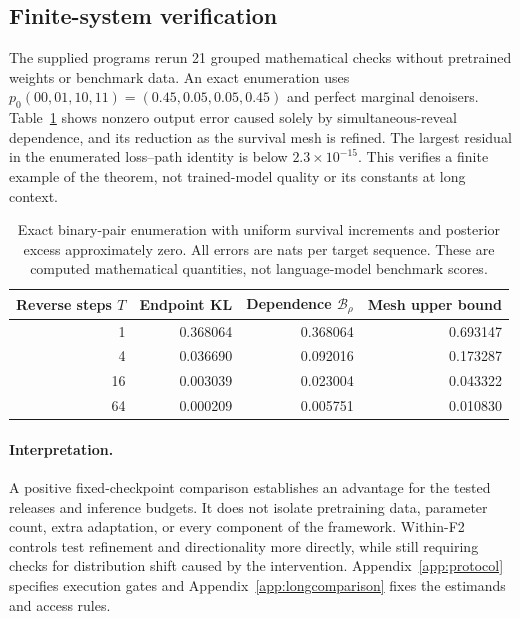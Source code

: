 \subsection{Finite-system verification}
The supplied programs rerun 21 grouped mathematical checks without pretrained weights or benchmark data. An exact enumeration uses $p_0(00,01,10,11)=(0.45,0.05,0.05,0.45)$ and perfect marginal denoisers. Table~\ref{m:finite} shows nonzero output error caused solely by simultaneous-reveal dependence, and its reduction as the survival mesh is refined. The largest residual in the enumerated loss--path identity is below $2.3\times10^{-15}$. This verifies a finite example of the theorem, not trained-model quality or its constants at long context.
\begin{table}[ht]
\centering\small
\caption{Exact binary-pair enumeration with uniform survival increments and posterior excess approximately zero. All errors are nats per target sequence. These are computed mathematical quantities, not language-model benchmark scores.}
\begin{tabular}{@{}rrrr@{}}
\toprule
Reverse steps $T$ & Endpoint KL & Dependence $\mathcal B_\rho$ & Mesh upper bound\\
\midrule
1 & 0.368064 & 0.368064 & 0.693147\\
4 & 0.036690 & 0.092016 & 0.173287\\
16 & 0.003039 & 0.023004 & 0.043322\\
64 & 0.000209 & 0.005751 & 0.010830\\
\bottomrule
\end{tabular}
\label{m:finite}
\end{table}

\paragraph{Interpretation.}
A positive fixed-checkpoint comparison establishes an advantage for the tested releases and inference budgets. It does not isolate pretraining data, parameter count, extra adaptation, or every component of the framework. Within-F2 controls test refinement and directionality more directly, while still requiring checks for distribution shift caused by the intervention. Appendix~\ref{app:protocol} specifies execution gates and Appendix~\ref{app:longcomparison} fixes the estimands and access rules.

